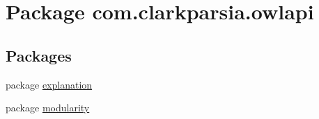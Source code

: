 \hypertarget{namespacecom_1_1clarkparsia_1_1owlapi}{\section{Package com.\-clarkparsia.\-owlapi}
\label{namespacecom_1_1clarkparsia_1_1owlapi}
}
\subsection*{Packages}
\begin{DoxyCompactItemize}
\item 
package \hyperlink{namespacecom_1_1clarkparsia_1_1owlapi_1_1explanation}{explanation}
\item 
package \hyperlink{namespacecom_1_1clarkparsia_1_1owlapi_1_1modularity}{modularity}
\end{DoxyCompactItemize}
